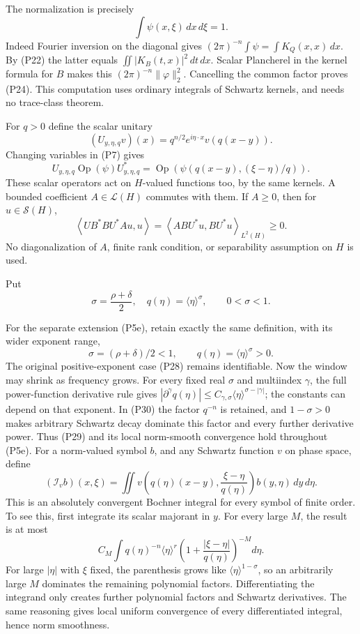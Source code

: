 \documentclass[
  11pt,
]{article}
\begin{document}
The normalization is precisely \[
 \int\psi(x,\xi)\,dx\,d\xi=1.
\tag{P24}
\] Indeed Fourier inversion on the diagonal gives
\((2\pi)^{-n}\int\psi=\int K_Q(x,x)\,dx\). By (P22) the latter equals
\(\iint|K_B(t,x)|^2\,dt\,dx\). Scalar Plancherel in the kernel formula
for \(B\) makes this \((2\pi)^{-n}\|\varphi\|_2^2\). Cancelling the
common factor proves (P24). This computation uses ordinary integrals of
Schwartz kernels, and needs no trace-class theorem.

For \(q>0\) define the scalar unitary \[
 (U_{y,\eta,q}v)(x)=q^{n/2}e^{i\eta\cdot x}v(q(x-y)).
\tag{P25}
\] Changing variables in (P7) gives \[
 U_{y,\eta,q}\operatorname{Op}(\psi)U_{y,\eta,q}^*
 =\operatorname{Op}\!\left(
 \psi(q(x-y),(\xi-\eta)/q)\right).
\tag{P26}
\] These scalar operators act on \(H\)-valued functions too, by the same
kernels. A bounded coefficient \(A\in\mathcal L(H)\) commutes with them.
If \(A\geq0\), then for \(u\in\mathcal S(H)\), \[
 \left\langle U B^*B U^*Au,u\right\rangle
 =\left\langle A B U^*u,B U^*u\right\rangle_{L^2(H)}\geq0.
\tag{P27}
\] No diagonalization of \(A\), finite rank condition, or separability
assumption on \(H\) is used.

Put \[
 \sigma=\frac{\rho+\delta}{2},\quad q(\eta)=\langle\eta\rangle^\sigma,
 \qquad 0<\sigma<1.
\tag{P28}
\]

For the separate extension (P5e), retain exactly the same definition,
with its wider exponent range, \[
 \sigma=(\rho+\delta)/2<1,\qquad q(\eta)=\langle\eta\rangle^\sigma>0.
 \tag{P28e}
\] The original positive-exponent case (P28) remains identifiable. Now
the window may shrink as frequency grows. For every fixed real
\(\sigma\) and multiindex \(\gamma\), the full power-function derivative
rule gives
\(|\partial^\gamma q(\eta)|\leq C_{\gamma,\sigma}\langle\eta\rangle^{\sigma-|\gamma|}\);
the constants can depend on that exponent. In (P30) the factor
\(q^{-n}\) is retained, and \(1-\sigma>0\) makes arbitrary Schwartz
decay dominate this factor and every further derivative power. Thus
(P29) and its local norm-smooth convergence hold throughout (P5e). For a
norm-valued symbol \(b\), and any Schwartz function \(v\) on phase
space, define \[
 (\mathcal I_v b)(x,\xi)=\iint
 v\!\left(q(\eta)(x-y),\frac{\xi-\eta}{q(\eta)}\right)
 b(y,\eta)\,dy\,d\eta.
\tag{P29}
\] This is an absolutely convergent Bochner integral for every symbol of
finite order. To see this, first integrate its scalar majorant in \(y\).
For every large \(M\), the result is at most \[
 C_M\int q(\eta)^{-n}\langle\eta\rangle^r
 \left(1+\frac{|\xi-\eta|}{q(\eta)}\right)^{-M}d\eta.
\tag{P30}
\] For large \(|\eta|\) with \(\xi\) fixed, the parenthesis grows like
\(\langle\eta\rangle^{1-\sigma}\), so an arbitrarily large \(M\)
dominates the remaining polynomial factors. Differentiating the
integrand only creates further polynomial factors and Schwartz
derivatives. The same reasoning gives local uniform convergence of every
differentiated integral, hence norm smoothness.
\end{document}
